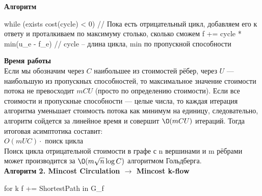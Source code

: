 {\bfseries Алгоритм}\\

\begin{cppcode}
	while (exists cost(cycle) < 0) // Пока есть отрицательный цикл, добавляем его к ответу и проталкиваем по максимуму столько, сколько сможем 
		f += cycle * min(u_e - f_e) // cycle -- длина цикла, min по пропускной способности
\end{cppcode}

{\bfseries Время работы}\\
Если мы обозначим через $C$ наибольшее из стоимостей рёбер, через $U$ — наибольшую из пропускных способностей, то максимальное значение стоимости потока не превосходит $mCU$ (просто по определению стоимости).
Если все стоимости и пропускные способности — целые числа, то каждая итерация алгоритма уменьшает стоимость потока как минимум на единицу, следовательно, алгоритм сойдется за линейное время и совершит $\O(mCU)$
итераций. Тогда итоговая асимптотика составит:\\
$O(mUC)\cdot$ поиск цикла\\
Поиск цикла отрицательной стоимости в графе с n вершинами и m рёбрами может производится за $\O(m\sqrt n \log C)$ алгоритмом Гольдберга.\\

{\bfseries Алгоритм 2. Mincost Circulation $\to$ Mincost k-flow}
\begin{cppcode}
	for k
		f += ShortestPath in G_f	
\end{cppcode}

